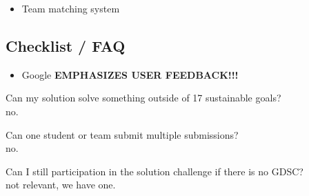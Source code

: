 \documentclass[
]{article}
\providecommand{\tightlist}{%
  \setlength{\itemsep}{0pt}\setlength{\parskip}{0pt}}
\begin{document}
\begin{itemize}
\tightlist
\item
  Team matching system
\end{itemize}

\subsection{Checklist / FAQ}\label{checklist-faq}

\begin{itemize}
\tightlist
\item
  Google \textbf{EMPHASIZES USER FEEDBACK!!!}
\end{itemize}

Can my solution solve something outside of 17 sustainable goals?\\
no.

Can one student or team submit multiple submissions?\\
no.

Can I still participation in the solution challenge if there is no
GDSC?\\
not relevant, we have one.
\end{document}
